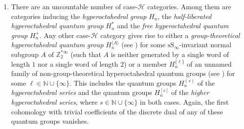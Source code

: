 \documentclass[10pt,a4paper]{amsart}
\numberwithin{equation}{section}
\newcommand{\pint}{\mathbb{N}}
\newcommand{\thedim}{n}
\newcommand{\oeqgH}[1]{H_{#1}}
\newcommand{\oeqgHstar}[1]{H^{\ast}_{#1}}
\newcommand{\oeqgHplus}[1]{H^{+}_{#1}}
\newcommand{\oeqgHcurly}[2]{H^{\{#1\}}_{#2}}
\newcommand{\oeqgHsquare}[2]{H^{[#1]}_{#2}}
\newcommand{\oeqgHround}[2]{H^{(#1)}_{#2}}
\newcommand{\oeqgHangle}[2]{H^{\langle #1\rangle}_{#2}}
\begin{document}
\begin{Remark}
\begin{enumerate}
          \item There are an uncountable number of case-$\mathcal{H}$ categories. Among them are  categories inducing the \emph{hyperoctahedral group} $\oeqgH{\thedim}$, the \emph{half-liberated hyperoctahedral quantum group} $\oeqgHstar{\thedim}$ and the \emph{free hyperoctahedral quantum group} $\oeqgHplus{\thedim}$. Any other case-$\mathcal{H}$ category gives rise to either a \emph{group-theoretical hyperoctahedral quantum group} $\oeqgHangle{A}{\thedim}$ (see \cite{RaumWeber2014,RaumWeber2016a}) for some $\mathrm{sS}_\infty$-invariant normal subgroup $A$  of $\mathbb{Z}_2^{\ast\infty}$ (such that $A$ is neither generated by a single word of length $1$ nor a single word of length $2$) or a member $\oeqgHcurly{\ell}{\thedim}$ of an unnamed family of non-group-theoretical hyperoctahedral quantum groups (see \cite{RaumWeber2016b}) for some $\ell\in \pint\cup\{\infty\}$. This includes the quantum groups $\oeqgHround{s}{\thedim}$ of the \emph{hyperoctahedral series} and the quantum groups $\oeqgHsquare{s}{\thedim}$ of the \emph{higher hyperoctahedral series}, where $s\in \pint\cup\{\infty\}$ in both cases. Again, the first cohomology with trivial coefficients of the discrete dual of any of these quantum groups vanishes.
      \end{enumerate}
    \end{Remark}
\end{document}
